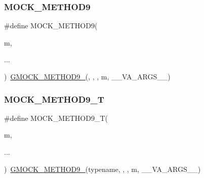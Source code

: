 \mbox{\label{_obj__test_2lib_2googletest-release-1_88_81_2googlemock_2include_2gmock_2gmock-generated-function-mockers_8h_ad6b30841fe780994d216cc8829cc127f}} 
\subsubsection{\texorpdfstring{MOCK\_METHOD9}{MOCK\_METHOD9}}
{\footnotesize\ttfamily \#define M\+O\+C\+K\+\_\+\+M\+E\+T\+H\+O\+D9(\begin{DoxyParamCaption}\item[{}]{m,  }\item[{}]{... }\end{DoxyParamCaption})~\mbox{\hyperlink{_obj__test_2lib_2googletest-release-1_88_81_2googlemock_2include_2gmock_2gmock-generated-function-mockers_8h_aa820171a19cc587c247dbe05cbffc55f}{G\+M\+O\+C\+K\+\_\+\+M\+E\+T\+H\+O\+D9\+\_\+}}(, , , m, \+\_\+\+\_\+\+V\+A\+\_\+\+A\+R\+G\+S\+\_\+\+\_\+)}

\mbox{\label{_obj__test_2lib_2googletest-release-1_88_81_2googlemock_2include_2gmock_2gmock-generated-function-mockers_8h_a838c68cbdf422cfc703b83daf1d1f1e1}} 
\subsubsection{\texorpdfstring{MOCK\_METHOD9\_T}{MOCK\_METHOD9\_T}}
{\footnotesize\ttfamily \#define M\+O\+C\+K\+\_\+\+M\+E\+T\+H\+O\+D9\+\_\+T(\begin{DoxyParamCaption}\item[{}]{m,  }\item[{}]{... }\end{DoxyParamCaption})~\mbox{\hyperlink{_obj__test_2lib_2googletest-release-1_88_81_2googlemock_2include_2gmock_2gmock-generated-function-mockers_8h_aa820171a19cc587c247dbe05cbffc55f}{G\+M\+O\+C\+K\+\_\+\+M\+E\+T\+H\+O\+D9\+\_\+}}(typename, , , m, \+\_\+\+\_\+\+V\+A\+\_\+\+A\+R\+G\+S\+\_\+\+\_\+)}

